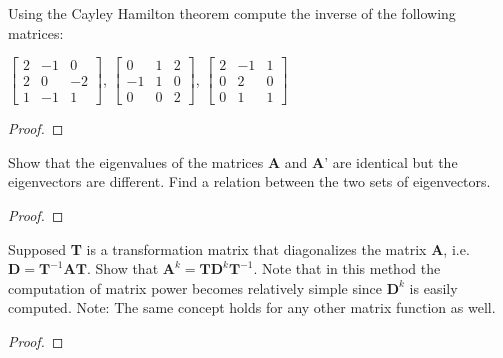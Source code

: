 \documentclass[conference,12pt,onecolumn,compsoc]{IEEEtran}
\begin{document}
\begin{exercise}
Using the Cayley Hamilton theorem compute the inverse of the following matrices:
\begin{center}

$\begin{bmatrix} 2 & -1 & 0 \\ 
2 & 0 & -2 \\
 1 & -1 & 1  \end{bmatrix}$, $\begin{bmatrix} 0 & 1 & 2 \\ 
-1 & 1 & 0 \\
 0 & 0 & 2  \end{bmatrix}$, $\begin{bmatrix} 2 & -1 & 1 \\ 
0 & 2 & 0 \\
 0 & 1 & 1  \end{bmatrix}$
\end{center}
\end{exercise}
\begin{proof}

\end{proof}

\begin{exercise}
Show that the eigenvalues of the matrices \textbf{A} and \textbf{A}' are identical but the eigenvectors are different. Find a relation between the two sets of eigenvectors.
\end{exercise}
\begin{proof}

\end{proof}

\begin{exercise}
Supposed \textbf{T} is a transformation matrix that diagonalizes the matrix \textbf{A}, i.e. $\textbf{D} = \textbf{T}^{-1}\textbf{AT}$. Show that $\textbf{A}^k = \textbf{TD}^k\textbf{T}^{-1}$. Note that in this method the computation of matrix power becomes relatively simple since $\textbf{D}^k$ is easily computed. Note: The same concept holds for any other matrix function as well. 
\end{exercise}
\begin{proof}

\end{proof}
\end{document}
